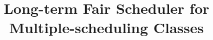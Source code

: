 \documentclass[letterpaper,twocolumn,10pt]{article}
\begin{document}
	
\date{}

\title{\Large \bf Long-term Fair Scheduler for Multiple-scheduling Classes}

\maketitle

\thispagestyle{empty}
	








	

{\footnotesize 
}
	
	
\end{document}
